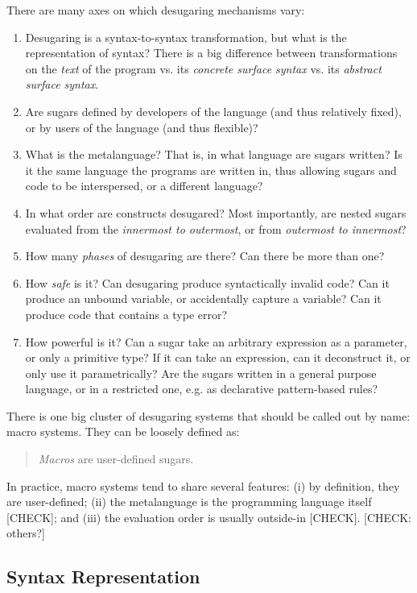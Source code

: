There are many axes on which desugaring mechanisms vary:
\begin{enumerate}
  \item Desugaring is a syntax-to-syntax transformation, but what is
    the representation of syntax? There is a big difference between
    transformations on the \emph{text} of the program vs. its
    \emph{concrete surface syntax} vs. its \emph{abstract surface
      syntax}.
  \item Are sugars defined by developers of the language (and thus
    relatively fixed), or by users of the language (and thus flexible)? %
  \item What is the metalanguage? That is, in what language are sugars
    written? Is it the same language the programs are written in, thus
    allowing sugars and code to be interspersed, or a different
    language?
  \item In what order are constructs desugared? Most importantly, are
    nested sugars evaluated from the \emph{innermost to outermost}, or
    from \emph{outermost to innermost}?
  \item How many \emph{phases} of desugaring are there? Can there be
    more than one?
  \item How \emph{safe} is it? Can desugaring produce syntactically
    invalid code? Can it produce an unbound variable, or accidentally
    capture a variable? Can it produce code that contains a type error?
  \item How powerful is it? Can a sugar take an arbitrary expression
    as a parameter, or only a primitive type? If it can take an
    expression, can it deconstruct it, or only use it parametrically?
    Are the sugars written in a general purpose language, or in a
    restricted one, e.g. as declarative pattern-based rules?
\end{enumerate}

There is one big cluster of desugaring systems that should be called
out by name: macro systems. They can be loosely defined as:
\begin{quote}
  \emph{Macros} are user-defined sugars.
\end{quote}
In practice, macro systems tend to share several features: (i) by
definition, they are user-defined; (ii) the metalanguage is the
programming language itself [CHECK]; and (iii) the evaluation order is
usually outside-in [CHECK]. [CHECK: others?]

\subsection{Syntax Representation}

